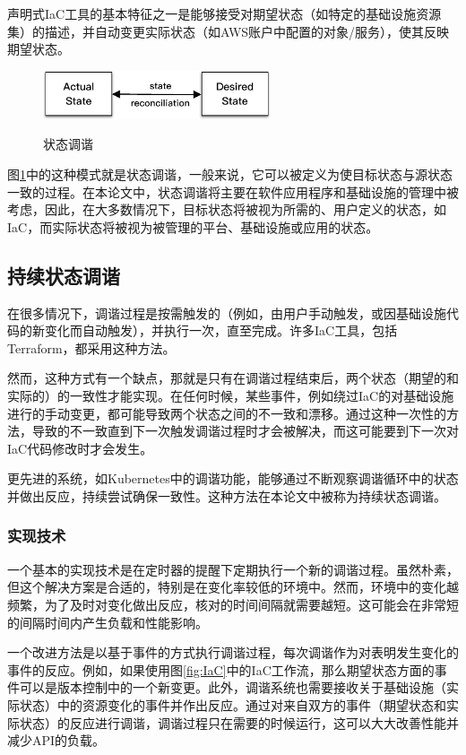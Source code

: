 \documentclass[macfonts,master]{njuthesis}
\begin{document}
声明式IaC工具的基本特征之一是能够接受对期望状态（如特定的基础设施资源集）的描述，并自动变更实际状态（如AWS账户中配置的对象/服务），使其反映期望状态。

\begin{figure}[htbp]
  \centering
  \includegraphics[width=0.6\textwidth]{pics/simple-state-reconciliation.pdf}\\
  \caption{状态调谐}\label{fig:ssr}
\end{figure}

图\ref{fig:ssr}中的这种模式就是状态调谐，一般来说，它可以被定义为使目标状态与源状态一致的过程。在本论文中，状态调谐将主要在软件应用程序和基础设施的管理中被考虑，因此，在大多数情况下，目标状态将被视为所需的、用户定义的状态，如IaC，而实际状态将被视为被管理的平台、基础设施或应用的状态。

\subsection{持续状态调谐}\label{section:continus-reconciliation}

在很多情况下，调谐过程是按需触发的（例如，由用户手动触发，或因基础设施代码的新变化而自动触发），并执行一次，直至完成。许多IaC工具，包括Terraform，都采用这种方法。

然而，这种方式有一个缺点，那就是只有在调谐过程结束后，两个状态（期望的和实际的）的一致性才能实现。在任何时候，某些事件，例如绕过IaC的对基础设施进行的手动变更，都可能导致两个状态之间的不一致和漂移。通过这种一次性的方法，导致的不一致直到下一次触发调谐过程时才会被解决，而这可能要到下一次对IaC代码修改时才会发生。

更先进的系统，如Kubernetes中的调谐功能，能够通过不断观察调谐循环中的状态并做出反应，持续尝试确保一致性。这种方法在本论文中被称为持续状态调谐。

\subsubsection{实现技术}

一个基本的实现技术是在定时器的提醒下定期执行一个新的调谐过程。虽然朴素，但这个解决方案是合适的，特别是在变化率较低的环境中。然而，环境中的变化越频繁，为了及时对变化做出反应，核对的时间间隔就需要越短。这可能会在非常短的间隔时间内产生负载和性能影响。

一个改进方法是以基于事件的方式执行调谐过程，每次调谐作为对表明发生变化的事件的反应。例如，如果使用图\ref{fig:IaC}中的IaC工作流，那么期望状态方面的事件可以是版本控制中的一个新变更。此外，调谐系统也需要接收关于基础设施（实际状态）中的资源变化的事件并作出反应。通过对来自双方的事件（期望状态和实际状态）的反应进行调谐，调谐过程只在需要的时候运行，这可以大大改善性能并减少API的负载。
\end{document}
